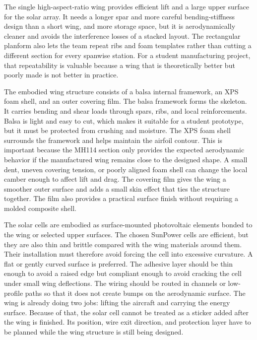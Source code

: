 The single high-aspect-ratio wing provides efficient lift and a large upper surface for the solar array. It needs a longer spar and more careful bending-stiffness design than a short wing, and more storage space, but it is aerodynamically cleaner and avoids the interference losses of a stacked layout. The rectangular planform also lets the team repeat ribs and foam templates rather than cutting a different section for every spanwise station. For a student manufacturing project, that repeatability is valuable because a wing that is theoretically better but poorly made is not better in practice.

The embodied wing structure consists of a balsa internal framework, an XPS foam shell, and an outer covering film. The balsa framework forms the skeleton. It carries bending and shear loads through spars, ribs, and local reinforcements. Balsa is light and easy to cut, which makes it suitable for a student prototype, but it must be protected from crushing and moisture. The XPS foam shell surrounds the framework and helps maintain the airfoil contour. This is important because the MH114 section only provides the expected aerodynamic behavior if the manufactured wing remains close to the designed shape. A small dent, uneven covering tension, or poorly aligned foam shell can change the local camber enough to affect lift and drag. The covering film gives the wing a smoother outer surface and adds a small skin effect that ties the structure together. The film also provides a practical surface finish without requiring a molded composite shell.

The solar cells are embodied as surface-mounted photovoltaic elements bonded to the wing or selected upper surfaces. The chosen SunPower cells are efficient, but they are also thin and brittle compared with the wing materials around them. Their installation must therefore avoid forcing the cell into excessive curvature. A flat or gently curved surface is preferred. The adhesive layer should be thin enough to avoid a raised edge but compliant enough to avoid cracking the cell under small wing deflections. The wiring should be routed in channels or low-profile paths so that it does not create bumps on the aerodynamic surface. The wing is already doing two jobs: lifting the aircraft and carrying the energy surface. Because of that, the solar cell cannot be treated as a sticker added after the wing is finished. Its position, wire exit direction, and protection layer have to be planned while the wing structure is still being designed.

